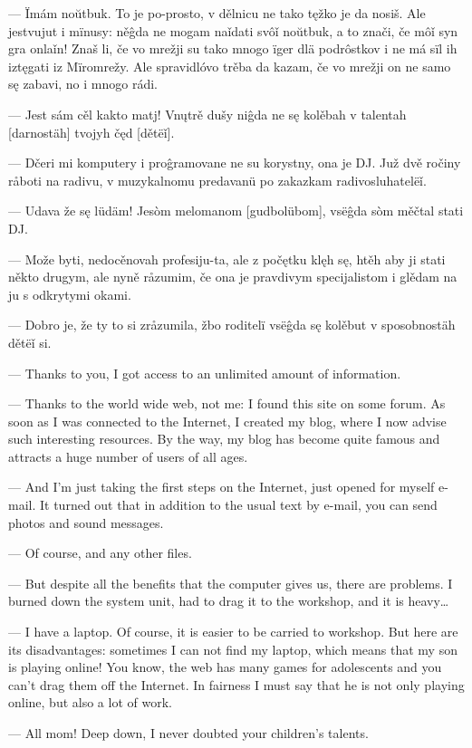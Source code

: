 — Ïmám noŭtbuk. To je po-prosto, v dělnicu ne tako tęžko je da nosiš. Ale jestvujut i mïnusy: něĝda ne mogam naǐdati svôǐ noŭtbuk, a to znači, če môǐ syn gra onlaǐn! Znaš li, če vo mrežji su tako mnogo ïger dlä podrôstkov i ne má sïl ih iztęgati iz Mïromrežy. Ale spravidlóvo trěba da kazam, če vo mrežji on ne samo sę zabavi, no i mnogo rádi.

— Jest sám cěl kakto matj! Vnųtrě dušy niĝda ne sę kolěbah v talentah [darnostäh] tvojyh čęd [dětëǐ].

— Dčeri mi komputery i proĝramovane ne su korystny, ona je DJ. Juž dvě ročiny råboti na radivu, v muzykalnomu predavanü po zakazkam radivosluhatelëǐ.

— Udava že sę lüdäm! Jesòm melomanom [gudbolübom], vsëĝda sòm měčtal stati DJ.

— Može byti, nedocěnovah profesiju-ta, ale z počętku klęh sę, htěh aby ji stati někto drugym, ale nyně råzumim, če ona je pravdivym specijalistom i glědam na ju s odkrytymi okami.

— Dobro je, že ty to si zråzumila, žbo roditelï vsëĝda sę kolěbut v sposobnostäh dětëǐ si.


— Thanks to you, I got access to an unlimited amount of information.

— Thanks to the world wide web, not me: I found this site on some forum. As soon as I was connected to the Internet, I created my blog, where I now advise such interesting resources. By the way, my blog has become quite famous and attracts a huge number of users of all ages.

— And I’m just taking the first steps on the Internet, just opened for myself e-mail. It turned out that in addition to the usual text by e-mail, you can send photos and sound messages.

— Of course, and any other files.

— But despite all the benefits that the computer gives us, there are problems. I burned down the system unit, had to drag it to the workshop, and it is heavy…

— I have a laptop. Of course, it is easier to be carried to workshop. But here are its disadvantages: sometimes I can not find my laptop, which means that my son is playing online! You know, the web has many games for adolescents and you can't drag them off the Internet. In fairness I must say that he is not only playing online, but also a lot of work.

— All mom! Deep down, I never doubted your children’s talents.

